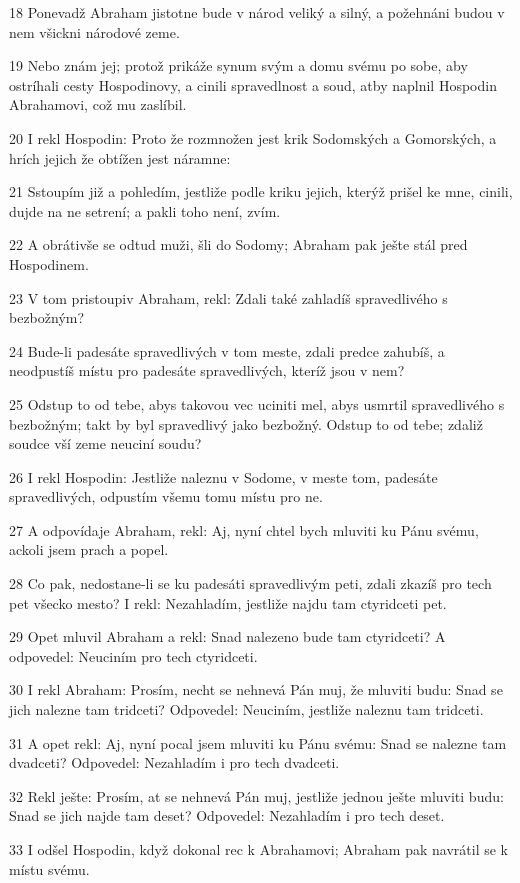 \par 18 Ponevadž Abraham jistotne bude v národ veliký a silný, a požehnáni budou v nem všickni národové zeme.
\par 19 Nebo znám jej; protož prikáže synum svým a domu svému po sobe, aby ostríhali cesty Hospodinovy, a cinili spravedlnost a soud, atby naplnil Hospodin Abrahamovi, což mu zaslíbil.
\par 20 I rekl Hospodin: Proto že rozmnožen jest krik Sodomských a Gomorských, a hrích jejich že obtížen jest náramne:
\par 21 Sstoupím již a pohledím, jestliže podle kriku jejich, kterýž prišel ke mne, cinili, dujde na ne setrení; a pakli toho není, zvím.
\par 22 A obrátivše se odtud muži, šli do Sodomy; Abraham pak ješte stál pred Hospodinem.
\par 23 V tom pristoupiv Abraham, rekl: Zdali také zahladíš spravedlivého s bezbožným?
\par 24 Bude-li padesáte spravedlivých v tom meste, zdali predce zahubíš, a neodpustíš místu pro padesáte spravedlivých, kteríž jsou v nem?
\par 25 Odstup to od tebe, abys takovou vec uciniti mel, abys usmrtil spravedlivého s bezbožným; takt by byl spravedlivý jako bezbožný. Odstup to od tebe; zdaliž soudce vší zeme neuciní soudu?
\par 26 I rekl Hospodin: Jestliže naleznu v Sodome, v meste tom, padesáte spravedlivých, odpustím všemu tomu místu pro ne.
\par 27 A odpovídaje Abraham, rekl: Aj, nyní chtel bych mluviti ku Pánu svému, ackoli jsem prach a popel.
\par 28 Co pak, nedostane-li se ku padesáti spravedlivým peti, zdali zkazíš pro tech pet všecko mesto? I rekl: Nezahladím, jestliže najdu tam ctyridceti pet.
\par 29 Opet mluvil Abraham a rekl: Snad nalezeno bude tam ctyridceti? A odpovedel: Neuciním pro tech ctyridceti.
\par 30 I rekl Abraham: Prosím, necht se nehnevá Pán muj, že mluviti budu: Snad se jich nalezne tam tridceti? Odpovedel: Neuciním, jestliže naleznu tam tridceti.
\par 31 A opet rekl: Aj, nyní pocal jsem mluviti ku Pánu svému: Snad se nalezne tam dvadceti? Odpovedel: Nezahladím i pro tech dvadceti.
\par 32 Rekl ješte: Prosím, at se nehnevá Pán muj, jestliže jednou ješte mluviti budu: Snad se jich najde tam deset? Odpovedel: Nezahladím i pro tech deset.
\par 33 I odšel Hospodin, když dokonal rec k Abrahamovi; Abraham pak navrátil se k místu svému.

